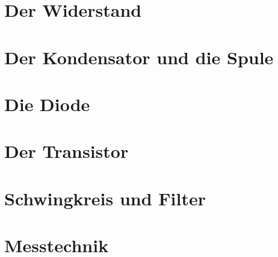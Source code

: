 \documentclass[ngerman,openany, oneside]{Script}
\begin{document}


\newpage

\chapter{Der Widerstand}


\chapter{Der Kondensator und die Spule}


\chapter{Die Diode}


\chapter{Der Transistor}


\chapter{Schwingkreis und Filter}


\chapter{Messtechnik}



\end{document}
